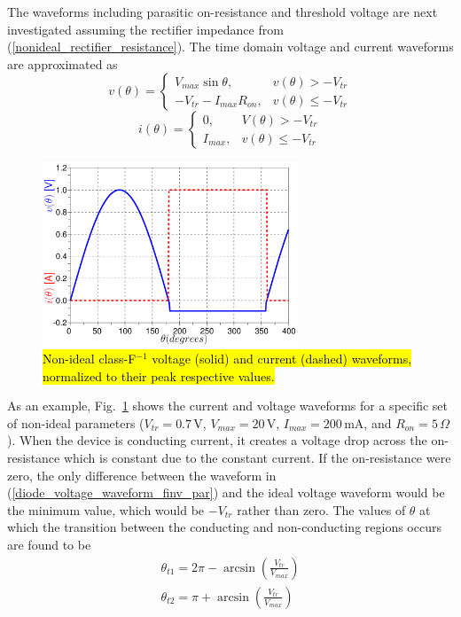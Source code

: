 The waveforms including parasitic on-resistance and threshold voltage are next investigated assuming the rectifier impedance from (\ref{nonideal_rectifier_resistance}). The time domain voltage and current waveforms are approximated as
\begin{equation}\label{diode_voltage_waveform_finv_par}
v(\theta) =
\begin{cases}
    V_{max}\sin\theta, & v(\theta) > -V_{tr}\\
    -V_{tr} - I_{max}R_{on}, & v(\theta) \leq -V_{tr}
\end{cases}
\end{equation}
\begin{equation}\label{diode_current_waveform_finv_par}
i(\theta) =
\begin{cases}
    0, & V(\theta) > -V_{tr}\\
    I_{max}, & v(\theta) \leq -V_{tr}
\end{cases}
\end{equation}



\begin{figure}[!b]
  \begin{center}
  \includegraphics[width=3.0in]{pdf/05.pdf}
  \caption{\hl{Non-ideal class-F$^{-1}$ voltage (solid) and current (dashed) waveforms, normalized to their peak respective values.}}\label{finv_waveform_nonideal}
  \end{center}
\end{figure}

As an example, Fig.~\ref{finv_waveform_nonideal} shows the current and voltage waveforms for a specific set of non-ideal parameters ($V_{tr} = 0.7\,\textrm{V}$, $V_{max} = 20\,\textrm{V}$, $I_{max} = 200\,\textrm{mA}$, and $R_{on} = 5\,\Omega$). When the device is conducting current, it creates a voltage drop across the on-resistance which is constant due to the constant current. If the on-resistance were zero, the only difference between the waveform in (\ref{diode_voltage_waveform_finv_par}) and the ideal voltage waveform would be the minimum value, which would be $-V_{tr}$ rather than zero. The values of $\theta$ at which the transition between the conducting and non-conducting regions occurs are found to be
\begin{equation}\label{trans_points_thetafinv2}
\begin{array}{l}
    \theta_{t1} = 2\pi - \arcsin\left(\frac{V_{tr}}{V_{max}}\right) \\
    \theta_{t2} = \pi + \arcsin\left(\frac{V_{tr}}{V_{max}}\right)
\end{array}
\end{equation}


